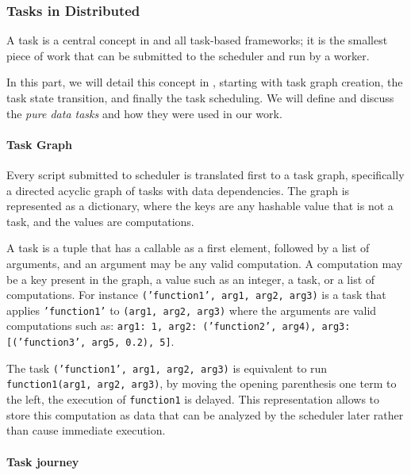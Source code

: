 \subsubsection{Tasks in \dask Distributed}
A task is a central concept in \dask and all task-based frameworks; it is the smallest piece of work that can be submitted to the scheduler and run by a worker. 

In this part, we will detail this concept in \dask, starting with task graph creation, the task state transition, and finally the task scheduling. We will define and discuss the \textit{pure data tasks} and how they were used in our work.



\paragraph{Task Graph}\label{sec:taskgraph}

Every script submitted to \dask scheduler is translated first to a task graph, specifically a directed acyclic graph of tasks with data dependencies. The graph is represented as a dictionary, where the keys are any hashable value that is not a task, and the values are computations. 

A task is a tuple that has a callable as a first element, followed by a list of arguments, and an argument may be any valid computation. A computation may be a key present in the graph, a value such as an integer, a task, or a list of computations. For instance \texttt{('function1', arg1, arg2, arg3)} is a task that applies \texttt{'function1'} to \texttt{(arg1, arg2, arg3)} where the arguments are valid computations such as: \texttt{{arg1: 1, arg2: ('function2', arg4), arg3: [('function3', arg5, 0.2), 5]}}.

The task \texttt{('function1', arg1, arg2, arg3)} is equivalent to run \texttt{function1(arg1, arg2, arg3)}, by moving the opening parenthesis one term to the left, the execution of \texttt{function1} is delayed. This representation allows \dask to store this computation as data that can be analyzed by the scheduler later rather than cause immediate execution.   

\paragraph{Task journey}

